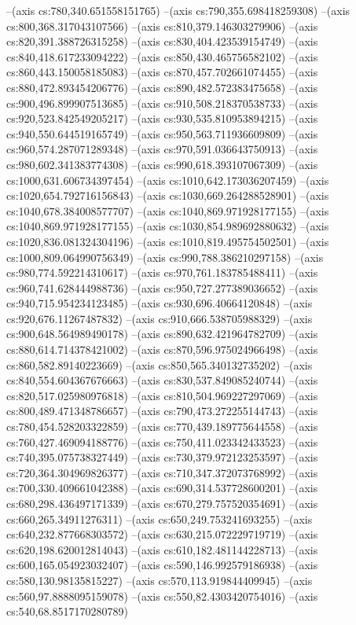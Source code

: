 --(axis cs:780,340.651558151765)
--(axis cs:790,355.698418259308)
--(axis cs:800,368.317043107566)
--(axis cs:810,379.146303279906)
--(axis cs:820,391.388726315258)
--(axis cs:830,404.423539154749)
--(axis cs:840,418.617233094222)
--(axis cs:850,430.465756582102)
--(axis cs:860,443.150058185083)
--(axis cs:870,457.702661074455)
--(axis cs:880,472.893454206776)
--(axis cs:890,482.572383475658)
--(axis cs:900,496.899907513685)
--(axis cs:910,508.218370538733)
--(axis cs:920,523.842549205217)
--(axis cs:930,535.810953894215)
--(axis cs:940,550.644519165749)
--(axis cs:950,563.711936609809)
--(axis cs:960,574.287071289348)
--(axis cs:970,591.036643750913)
--(axis cs:980,602.341383774308)
--(axis cs:990,618.393107067309)
--(axis cs:1000,631.606734397454)
--(axis cs:1010,642.173036207459)
--(axis cs:1020,654.792716156843)
--(axis cs:1030,669.264288528901)
--(axis cs:1040,678.384008577707)
--(axis cs:1040,869.971928177155)
--(axis cs:1040,869.971928177155)
--(axis cs:1030,854.989692880632)
--(axis cs:1020,836.081324304196)
--(axis cs:1010,819.495754502501)
--(axis cs:1000,809.064990756349)
--(axis cs:990,788.386210297158)
--(axis cs:980,774.592214310617)
--(axis cs:970,761.183785488411)
--(axis cs:960,741.628444988736)
--(axis cs:950,727.277389036652)
--(axis cs:940,715.954234123485)
--(axis cs:930,696.40664120848)
--(axis cs:920,676.11267487832)
--(axis cs:910,666.538705988329)
--(axis cs:900,648.564989490178)
--(axis cs:890,632.421964782709)
--(axis cs:880,614.714378421002)
--(axis cs:870,596.975024966498)
--(axis cs:860,582.89140223669)
--(axis cs:850,565.340132735202)
--(axis cs:840,554.604367676663)
--(axis cs:830,537.849085240744)
--(axis cs:820,517.025980976818)
--(axis cs:810,504.969227297069)
--(axis cs:800,489.471348786657)
--(axis cs:790,473.272255144743)
--(axis cs:780,454.528203322859)
--(axis cs:770,439.189775644558)
--(axis cs:760,427.469094188776)
--(axis cs:750,411.023342433523)
--(axis cs:740,395.075738327449)
--(axis cs:730,379.972123253597)
--(axis cs:720,364.304969826377)
--(axis cs:710,347.372073768992)
--(axis cs:700,330.409661042388)
--(axis cs:690,314.537728600201)
--(axis cs:680,298.436497171339)
--(axis cs:670,279.757520354691)
--(axis cs:660,265.34911276311)
--(axis cs:650,249.753241693255)
--(axis cs:640,232.877668303572)
--(axis cs:630,215.072229719719)
--(axis cs:620,198.620012814043)
--(axis cs:610,182.481144228713)
--(axis cs:600,165.054923032407)
--(axis cs:590,146.992579186938)
--(axis cs:580,130.98135815227)
--(axis cs:570,113.919844409945)
--(axis cs:560,97.8888095159078)
--(axis cs:550,82.4303420754016)
--(axis cs:540,68.8517170280789)
